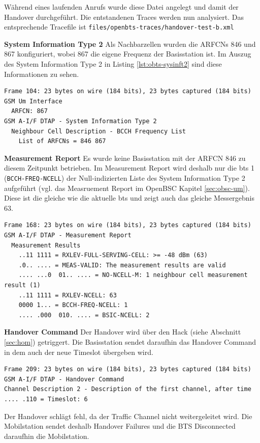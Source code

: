 Während eines laufenden Anrufs wurde diese Datei angelegt und damit der Handover durchgeführt. Die entstandenen Traces werden nun analysiert. Das entsprechende Tracefile ist \lstinline{files/openbts-traces/handover-test-b.xml}

\textbf{System Information Type 2} Als Nachbarzellen wurden die \glspl{ARFCN} 846 und 867 konfiguriert, wobei 867 die eigene Frequenz der Basisstation ist. Im Auszug des System Information Type 2 in Listing \ref{lst:obts-sysinft2} sind diese Informationen zu sehen.

\begin{lstlisting}[label=lst:obts-sysinft2, caption={Auszug aus dem System Information Type 2 von OpenBTS}]
Frame 104: 23 bytes on wire (184 bits), 23 bytes captured (184 bits)
GSM Um Interface
  ARFCN: 867
GSM A-I/F DTAP - System Information Type 2
  Neighbour Cell Description - BCCH Frequency List
    List of ARFCNs = 846 867
\end{lstlisting}

\textbf{Measurement Report} Es wurde keine Basisstation mit der \gls{ARFCN} 846 zu diesem Zeitpunkt betrieben. Im Measurement Report wird deshalb nur die \gls{bts} 1 (\lstinline{BCCH-FREQ-NCELL}) der Null-indizierten Liste des System Information Type 2 aufgeführt (vgl. das Measruement Report im OpenBSC Kapitel \ref{sec:obsc-um}). Diese ist die gleiche wie die aktuelle \gls{bts} und zeigt auch das gleiche Messergebnis 63.

\begin{lstlisting}[label=lst:obts-mmrept, caption={Auszug aus dem Measurement Report}]
Frame 168: 23 bytes on wire (184 bits), 23 bytes captured (184 bits)
GSM A-I/F DTAP - Measurement Report
  Measurement Results
    ..11 1111 = RXLEV-FULL-SERVING-CELL: >= -48 dBm (63)
    .0.. .... = MEAS-VALID: The measurement results are valid
    .... ...0  01.. .... = NO-NCELL-M: 1 neighbour cell measurement result (1)
    ..11 1111 = RXLEV-NCELL: 63
    0000 1... = BCCH-FREQ-NCELL: 1
    .... .000  010. .... = BSIC-NCELL: 2
\end{lstlisting}

\textbf{Handover Command} Der Handover wird über den Hack (siehe Abschnitt \ref{sec:hom}) getriggert. Die Basisstation sendet daraufhin das Handover Command in dem auch der neue Timeslot übergeben wird. 

\begin{lstlisting}[label=obtshoc, caption={Auszug aus dem Handover Command}]
Frame 209: 23 bytes on wire (184 bits), 23 bytes captured (184 bits)
GSM A-I/F DTAP - Handover Command
Channel Description 2 - Description of the first channel, after time
.... .110 = Timeslot: 6
\end{lstlisting}

Der Handover schlägt fehl, da der Traffic Channel nicht weitergeleitet wird. Die Mobilstation sendet deshalb Handover Failures und die BTS Disconnected daraufhin die Mobilstation.























